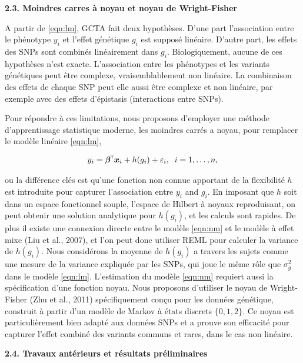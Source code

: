 \documentclass[11pt]{article}
\newcommand{\trans}{^{\mbox{\tiny {\sf T}}}}
\newcommand{\xbf}{{\bm x}}
\newcommand{\greekbold}[1]{\mbox{\boldmath $#1$}}
\newcommand{\betabf}{\greekbold{\beta}}
\begin{document}
\noindent
\textbf{2.3. Moindres carres à noyau et noyau de Wright-Fisher}
\smallskip

\noindent
A partir de \eqref{eqn:lm}, GCTA fait deux hypothèses. D'une part l'association entre le phénotype $y_i$ et l'effet génétique $g_i$ est supposé linéaire. D'autre part, les effets des SNPs sont combinés linéairement dans $g_i$. Biologiquement, aucune de ces hypothèses n'est exacte. L'association entre les phénotypes et les variants génétiques peut être complexe, vraisemblablement non linéaire. La combinaison des effets de chaque SNP peut elle aussi être complexe et non linéaire, par exemple avec des effets d'épistasis (interactions entre SNPs). 

Pour répondre à ces limitations, nous proposons d'employer une méthode d'apprentissage statistique moderne, les moindres carrés a noyau, pour remplacer le modèle linéaire \eqref{eqn:lm},

\begin{eqnarray} \label{eqn:nm}
y_i = \betabf\trans \xbf_i + h(g_i) + \varepsilon_i, \;\; i = 1, \ldots, n,
\end{eqnarray}

ou la différence clés est qu'une fonction non connue apportant de la flexibilité $h$ est introduite pour capturer l'association entre $y_i$ and $g_i$. En imposant que $h$ soit dans un espace fonctionnel souple, l'espace de Hilbert à noyaux reproduisant, on peut obtenir une solution analytique pour $h(g_i)$, et les calculs sont rapides. De plus il existe une connexion directe entre le modèle  \eqref{eqn:nm} et le modèle à effet mixe (Liu et al., 2007), et l'on peut donc utiliser REML pour calculer la variance de $h(g_i)$. Nous considérons la moyenne de $h(g_i)$ a travers les sujets comme une mesure de la variance expliquée par les SNPs, qui joue le même rôle que $\sigma^2_g$ dans le modèle \eqref{eqn:lm}. L'estimation du modèle  \eqref{eqn:nm} requiert aussi la spécification d'une fonction noyau. Nous proposons d'utiliser le noyau de  Wright-Fisher (Zhu et al., 2011) spécifiquement conçu pour les données génétique, construit à partir d'un modèle de Markov à états discrets  $\{0,1,2\}$. Ce noyau est particulièrement bien adapté aux données SNPs et a prouve son efficacité pour capturer l'effet combiné des variants communs et rares, dans le cas non linéaire.
\medskip

\noindent
\textbf{2.4. Travaux antérieurs et résultats préliminaires}
\smallskip
\end{document}
